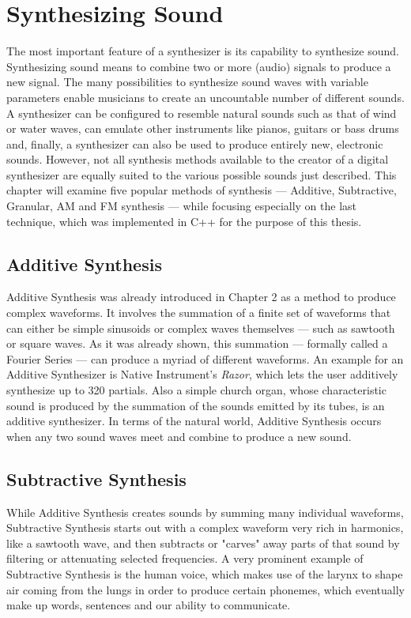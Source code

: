 \chapter{Synthesizing Sound}

The most important feature of a synthesizer is its capability to synthesize sound. Synthesizing sound means to combine two or more (audio) signals to produce a new signal. The many possibilities to synthesize sound waves with variable parameters enable musicians to create an uncountable number of different sounds. A synthesizer can be configured to resemble natural sounds such as that of wind or water waves, can emulate other instruments like pianos, guitars or bass drums and, finally, a synthesizer can also be used to produce entirely new, electronic sounds. However, not all synthesis methods available to the creator of a digital synthesizer are equally suited to the various possible sounds just described. This chapter will examine five popular methods of synthesis --- Additive, Subtractive, Granular, AM and FM synthesis --- while focusing especially on the last technique, which was implemented in C++ for the purpose of this thesis.

\section{Additive Synthesis}

Additive Synthesis was already introduced in Chapter 2 as a method to produce complex waveforms. It involves the summation of a finite set of waveforms that can either be simple sinusoids or complex waves themselves --- such as sawtooth or square waves. As it was already shown, this summation --- formally called a Fourier Series --- can produce a myriad of different waveforms. An example for an Additive Synthesizer is Native Instrument's \emph{Razor}, which lets the user additively synthesize up to 320 partials. Also a simple church organ, whose characteristic sound is produced by the summation of the sounds emitted by its tubes, is an additive synthesizer. In terms of the natural world, Additive Synthesis occurs when any two sound waves meet and combine to produce a new sound.

\section{Subtractive Synthesis}

While Additive Synthesis creates sounds by summing many individual waveforms, Subtractive Synthesis starts out with a complex waveform very rich in harmonics, like a sawtooth wave, and then subtracts or "carves" away parts of that sound by filtering or attenuating selected frequencies. A very prominent example of Subtractive Synthesis is the human voice, which makes use of the larynx to shape air coming from the lungs in order to produce certain phonemes, which eventually make up words, sentences and our ability to communicate.

